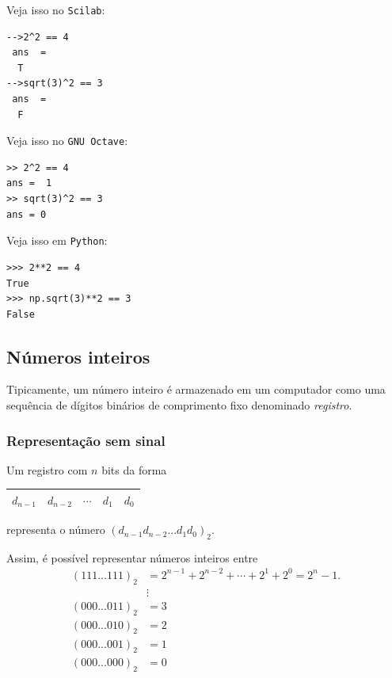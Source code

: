 \ifisscilab
Veja isso no \verb+Scilab+:
\begin{verbatim}
-->2^2 == 4
 ans  =
  T  
-->sqrt(3)^2 == 3
 ans  =
  F  
\end{verbatim}
\fi
\ifisoctave
Veja isso no \verb+GNU Octave+:
\begin{verbatim}
>> 2^2 == 4
ans =  1
>> sqrt(3)^2 == 3
ans = 0
\end{verbatim}
\fi
\ifispython
Veja isso em \verb+Python+:
\begin{verbatim}
>>> 2**2 == 4
True
>>> np.sqrt(3)**2 == 3
False
\end{verbatim}
\fi

\subsection{Números inteiros}

Tipicamente, um número inteiro é armazenado em um computador como uma sequência de dígitos binários de comprimento fixo denominado \emph{registro}.

\subsubsection{Representação sem sinal}
Um registro com $n$ bits da forma
 \begin{center}
   \begin{tabular}{|c|c|c|c|c|}\hline
     $d_{n-1}$ & $d_{n-2}$ & $\cdots$ & $d_1$ & $d_0$\\\hline
   \end{tabular}  
 \end{center}
representa o número $(d_{n-1}d_{n-2}...d_1d_0)_2$. 

Assim, é possível representar números inteiros entre
\begin{equation*}
\begin{split}
  (111...111)_2 & = 2^{n-1}+2^{n-2}+\cdots+2^1+2^0=2^n-1.\\
                &\vdots\\
  (000...011)_2 &= 3 \\
  (000...010)_2 &= 2 \\
  (000...001)_2 &= 1 \\
  (000...000)_2 & = 0 
\end{split}
\end{equation*}

